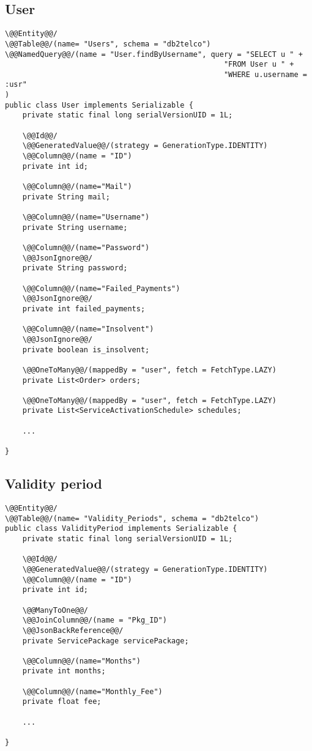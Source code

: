 \subsection*{User}

\begin{lstlisting}[style = JPA]
\@@Entity@@/
\@@Table@@/(name= "Users", schema = "db2telco")
\@@NamedQuery@@/(name = "User.findByUsername", query = "SELECT u " + 
                                                  "FROM User u " + 
                                                  "WHERE u.username = :usr"
)
public class User implements Serializable {
    private static final long serialVersionUID = 1L;

    \@@Id@@/
    \@@GeneratedValue@@/(strategy = GenerationType.IDENTITY)
    \@@Column@@/(name = "ID")
    private int id;

    \@@Column@@/(name="Mail")
    private String mail;

    \@@Column@@/(name="Username")
    private String username;

    \@@Column@@/(name="Password")
    \@@JsonIgnore@@/
    private String password;

    \@@Column@@/(name="Failed_Payments")
    \@@JsonIgnore@@/
    private int failed_payments;

    \@@Column@@/(name="Insolvent")
    \@@JsonIgnore@@/
    private boolean is_insolvent;

    \@@OneToMany@@/(mappedBy = "user", fetch = FetchType.LAZY)
    private List<Order> orders;

    \@@OneToMany@@/(mappedBy = "user", fetch = FetchType.LAZY)
    private List<ServiceActivationSchedule> schedules;
    
    ...

}
\end{lstlisting}

\subsection*{Validity period}

\begin{lstlisting}[style = JPA]
\@@Entity@@/
\@@Table@@/(name= "Validity_Periods", schema = "db2telco")
public class ValidityPeriod implements Serializable {
    private static final long serialVersionUID = 1L;

    \@@Id@@/
    \@@GeneratedValue@@/(strategy = GenerationType.IDENTITY)
    \@@Column@@/(name = "ID")
    private int id;

    \@@ManyToOne@@/
    \@@JoinColumn@@/(name = "Pkg_ID")
    \@@JsonBackReference@@/
    private ServicePackage servicePackage;

    \@@Column@@/(name="Months")
    private int months;

    \@@Column@@/(name="Monthly_Fee")
    private float fee;
    
    ...

}
\end{lstlisting}

